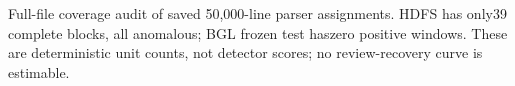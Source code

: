 Full-file coverage audit of saved 50,000-line parser assignments. HDFS has only39 complete blocks, all anomalous; BGL frozen test haszero positive windows. These are deterministic unit counts, not detector scores; no review-recovery curve is estimable.

